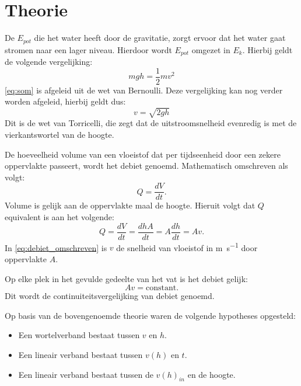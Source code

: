 \documentclass[numbers=endperiod]{scrartcl}
\begin{document}
\section{Theorie}

De $E_{pot}$ die het water heeft door de gravitatie, zorgt ervoor dat het water gaat stromen naar een lager niveau. Hierdoor wordt $E_{pot}$ omgezet in $E_{k}$. Hierbij geldt de volgende vergelijking:
\begin{equation}\label{eq:som}
mgh = \frac{1}{2} mv^2
\end{equation}
\cref{eq:som} is afgeleid uit de wet van Bernoulli. Deze vergelijking kan nog verder worden afgeleid, hierbij geldt dus:
\begin{equation}\label{torricelli}
v = \sqrt{2gh}
\end{equation}
Dit is de wet van Torricelli, die zegt dat de uitstroomsnelheid evenredig is met de vierkantswortel van de hoogte.

De hoeveelheid volume van een vloeistof dat per tijdseenheid door een zekere oppervlakte passeert, wordt het debiet genoemd. Mathematisch omschreven als volgt:
\begin{equation}\label{eq:debiet}
    Q = \frac{dV}{dt}.
\end{equation}
Volume is gelijk aan de oppervlakte maal de hoogte. Hieruit volgt dat $Q$ equivalent is aan het volgende:
\begin{equation}\label{eq:debiet_omschreven}
    Q = \frac{dV}{dt} = \frac{dhA}{dt} = A\frac{dh}{dt} = Av.
\end{equation}
In \cref{eq:debiet_omschreven} is $v$ de snelheid van vloeistof in \si{\meter\per\second} door oppervlakte $A$.

Op elke plek in het gevulde gedeelte van het vat is het debiet gelijk: 
\begin{equation}\label{eq:constant_debiet}
    Av = \text{constant}.
\end{equation}
Dit wordt de continuiteitsvergelijking van debiet genoemd.

Op basis van de bovengenoemde theorie waren de volgende hypotheses opgesteld:
\begin{itemize}
 \renewcommand{\labelitemi}{\scriptsize$\blacksquare$}
    \item Een wortelverband bestaat tussen $v$ en $h$.
    \item Een lineair verband bestaat tussen $v(h)$ en $t$.
    \item Een lineair verband bestaat tussen de $v(h)_{in}$ en de hoogte. 
\end{itemize}
\end{document}
